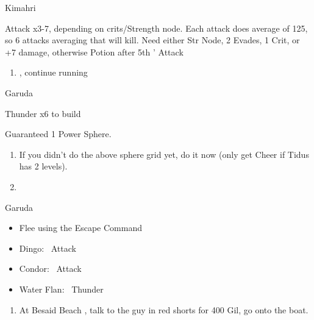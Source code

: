 \begin{battle}[750]{Kimahri}
    \begin{itemize}
        \tidusf Attack x3-7, depending on crits/Strength node.
        \tidusf Each attack does average of 125, so 6 attacks averaging that will kill.
        \tidusf Need either Str Node, 2 Evades, 1 Crit, or +7 damage, otherwise Potion after 5th \tidus' Attack
    \end{itemize}
\end{battle}
\begin{enumerate}[resume]
    \item \sd, continue running
\end{enumerate}
\begin{battle}{Garuda}
    \begin{itemize}
        \summon{\valefor}
        \valeforf Thunder x6 to build \od
    \end{itemize}
    Guaranteed 1 Power Sphere.
\end{battle}
\begin{enumerate}[resume]
    \item If you didn't do the above sphere grid yet, do it now (only get Cheer if Tidus has 2 levels).
    \item \formation{\tidus}{\yuna}{\lulu}
\end{enumerate}
\begin{battle}{Garuda}
    \begin{itemize}
        \item Flee using the Escape Command
    \end{itemize}
\end{battle}
\begin{encounters}
    \begin{itemize}
        \item Dingo: \tidus\ Attack
        \item Condor: \wakka\ Attack
        \item Water Flan: \lulu\ Thunder
    \end{itemize}
\end{encounters}
\begin{enumerate}[resume]
    \item At Besaid Beach \save, talk to the guy in red shorts for 400 Gil, go onto the boat.
\end{enumerate}